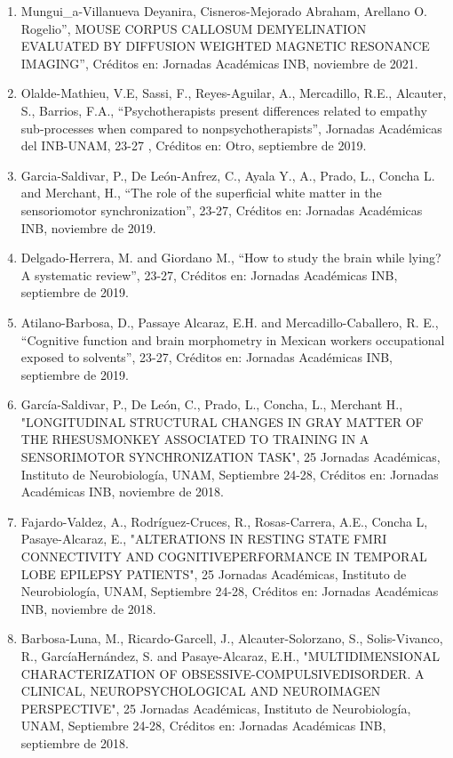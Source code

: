 \begin{enumerate}
\item  Mungui_a-Villanueva Deyanira, Cisneros-Mejorado Abraham, Arellano O. Rogelio”, MOUSE CORPUS CALLOSUM DEMYELINATION 
EVALUATED BY DIFFUSION WEIGHTED MAGNETIC RESONANCE IMAGING”, Créditos en: Jornadas Académicas INB, noviembre de 2021.

\item  Olalde-Mathieu, V.E, Sassi, F., Reyes-Aguilar, A., Mercadillo, R.E., Alcauter, S., Barrios, F.A., “Psychotherapists 
present differences related to empathy sub-processes when compared to nonpsychotherapists”, Jornadas Académicas del INB-UNAM, 
23-27 , Créditos en: Otro, septiembre de 2019.

\item  Garcia-Saldivar, P., De León-Anfrez, C., Ayala Y., A., Prado, L., Concha L. and Merchant, H., “The role of the 
superficial white matter in the sensoriomotor synchronization”, 23-27, Créditos en: Jornadas Académicas INB, noviembre de 
2019.

\item  Delgado-Herrera, M. and Giordano M., “How to study the brain while lying? A systematic review”, 23-27, Créditos en: 
Jornadas Académicas INB, septiembre de 2019.

\item  Atilano-Barbosa, D., Passaye Alcaraz, E.H. and Mercadillo-Caballero, R. E., “Cognitive function and brain morphometry 
in 
Mexican workers occupational exposed to solvents”, 23-27, Créditos en: Jornadas Académicas INB, septiembre de 2019.

\item  García-Saldivar, P., De León, C., Prado, L., Concha, L., Merchant H., "LONGITUDINAL STRUCTURAL CHANGES IN GRAY MATTER 
OF 
THE RHESUSMONKEY ASSOCIATED TO TRAINING IN A SENSORIMOTOR SYNCHRONIZATION TASK", 25 Jornadas Académicas, Instituto de 
Neurobiología, UNAM, Septiembre 24-28, Créditos en: Jornadas Académicas INB, noviembre de 2018.

\item  Fajardo-Valdez, A., Rodríguez-Cruces, R., Rosas-Carrera, A.E., Concha L, Pasaye-Alcaraz, E., "ALTERATIONS IN RESTING 
STATE FMRI CONNECTIVITY AND COGNITIVEPERFORMANCE IN TEMPORAL LOBE EPILEPSY PATIENTS", 25 Jornadas Académicas, Instituto de 
Neurobiología, UNAM, Septiembre 24-28, Créditos en: Jornadas Académicas INB, noviembre de 2018.

\item  Barbosa-Luna, M., Ricardo-Garcell, J., Alcauter-Solorzano, S., Solis-Vivanco, R., GarcíaHernández, S. and 
Pasaye-Alcaraz, 
E.H., "MULTIDIMENSIONAL CHARACTERIZATION OF OBSESSIVE-COMPULSIVEDISORDER. A CLINICAL, NEUROPSYCHOLOGICAL AND
NEUROIMAGEN PERSPECTIVE", 25 Jornadas Académicas, Instituto de Neurobiología, UNAM, Septiembre 24-28, Créditos en: Jornadas 
Académicas INB, septiembre de 2018.


\end{enumerate}
